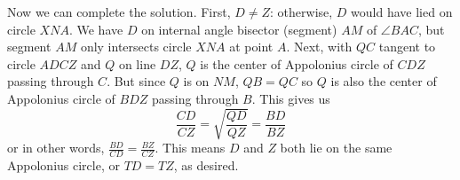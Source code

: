 \documentclass[11pt,a4paper]{article}
\begin{document}
\begin{enumerate}
        Now we can complete the solution. 
        First, $D\neq Z$: otherwise, $D$ would have lied on circle $XNA$. 
        We have $D$ on internal angle bisector (segment) $AM$ of $\angle BAC$, but segment $AM$ only intersects circle $XNA$ at point $A$. 
        Next, with $QC$ tangent to circle $ADCZ$ and $Q$ on line $DZ$, 
        $Q$ is the center of Appolonius circle of $CDZ$ passing through $C$. 
        But since $Q$ is on $NM$, $QB=QC$ so $Q$ is also the center of Appolonius circle of $BDZ$ passing through $B$. 
        This gives us 
        \[
        \frac{CD}{CZ}=\sqrt{\frac{QD}{QZ}} = \frac{BD}{BZ}
        \]
        or in other words, $\frac{BD}{CD}=\frac{BZ}{CZ}$. 
        This means $D$ and $Z$ both lie on the same Appolonius circle, or $TD=TZ$, as desired. 
        
	\end{enumerate}
	
\end{document}
